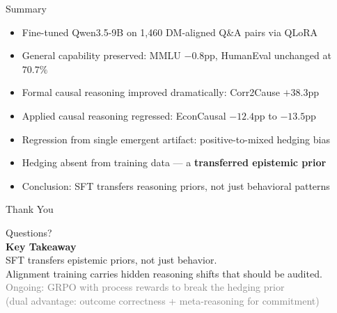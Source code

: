 \documentclass[aspectratio=169,12pt]{beamer}
\begin{document}
\begin{frame}{Summary}
  \begin{itemize}
    \item Fine-tuned Qwen3.5-9B on 1,460 DM-aligned Q\&A pairs via QLoRA
    \item General capability preserved: MMLU $-0.8$pp, HumanEval unchanged at $70.7\%$
    \item Formal causal reasoning improved dramatically: Corr2Cause $\mathbf{+38.3}$pp
    \item Applied causal reasoning regressed: EconCausal $\mathbf{-12.4}$pp to $\mathbf{-13.5}$pp
    \item Regression from single emergent artifact: positive-to-mixed hedging bias
    \item Hedging absent from training data --- a \textbf{transferred epistemic prior}
    \item \alert{Conclusion: SFT transfers reasoning priors, not just behavioral patterns}
  \end{itemize}

\end{frame}

\begin{frame}{Thank You}
  \begin{center}
    \vspace{1em}
    \Large Questions? \\[1.5em]
    \textcolor{iclraccent}{\textbf{Key Takeaway}} \\[0.5em]
    SFT transfers epistemic priors, not just behavior. \\
    Alignment training carries hidden reasoning shifts that should be audited. \\[1.5em]
    \small\textcolor{gray}{Ongoing: GRPO with process rewards to break the hedging prior \\ (dual advantage: outcome correctness + meta-reasoning for commitment)}
  \end{center}

\end{frame}
\end{document}

